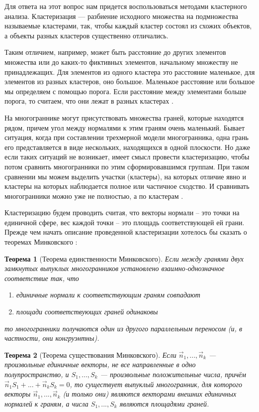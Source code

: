 \documentclass[a4paper,12pt, titlepage]{article}
\begin{document}
Для ответа на этот вопрос нам придется воспользоваться методами кластерного анализа. Кластеризация ---
разбиение исходного множества на 
подмножества называемые кластерами, так, чтобы каждый кластер состоял из схожих объектов, 
а объекты разных кластеров существенно отличались. 

Таким отличием, например, может быть расстояние до других 
элементов множества или до каких-то фиктивных элементов, начальному множеству не принадлежащих. 
Для элементов из одного кластера это расстояние маленькое, для элементов из разных 
кластеров, оно большое. Маленькое расстояние или большое мы определяем с помощью порога. Если расстояние между элементами 
больше порога, то считаем, что они лежат в разных кластерах \cite{mand}. 

На многограннике могут присутствовать 
множества граней, которые находятся рядом, причем угол между нормалями к этим граням очень маленький. Бывает ситуация, 
когда при составлении трехмерной модели многогранника, одна грань его представляется в виде нескольких, находящихся в одной 
плоскости. Но даже если таких ситуаций не возникает, имеет смысл провести кластеризацию, чтобы потом сравнить многогранники по 
этим сформировавшимся группам. 
При таком сравнении мы можем выделить участки (кластеры), на которых отличие явно и кластеры на которых наблюдается полное или
частичное сходство.  И сравнивать многогранники можно уже не полностью, а по кластерам \cite{prep}.

Кластеризацию будем проводить считая, что векторы нормали -- это точки на единичной сфере, вес каждой точки -- это площадь 
соответствующей ей грани.
Прежде чем начать описание проведенной кластеризации хотелось бы сказать о теоремах Минковского\cite{mink} :

\newtheorem{Th}{Теорема}
\begin{Th}[Теорема единственности Минковского]\label{thMin1}
Если между гранями двух замкнутых выпуклых многогранников установлено взаимно-однозначное соответствие так, что
\begin{enumerate}
\item единичные нормали к соответствующим граням совпадают
\item площади соответствующих граней одинаковы
\end{enumerate}
то многогранники получаются один из другого параллельным переносом (и, в частности, они конгруэнтны).
\end{Th}

\begin{Th}[Теорема существования Минковского]\label{thMin2}
Если  $\vec n_1, ..., \vec n_k$ —  произвольные единичные векторы, не все направленные в одно полупространство, 
и $S_1, ..., S_k$  — произвольные положительные числа, причём $\vec n_1 S_1 + ...+\vec n_k S_k = 0$, то существует выпуклый 
многогранник, для которого векторы
$\vec n_1, ...,\vec n_k$  (и только они) являются векторами внешних единичных нормалей к граням, а числа  
$S_1, ..., S_k$ являются площадями граней.
\end{Th}
\end{document}
